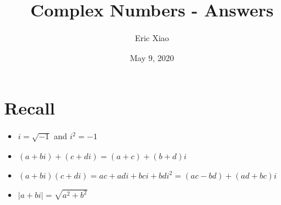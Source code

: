 \documentclass[12pt]{extarticle}
\title{Complex Numbers - Answers}
\author{Eric Xiao}
\date{May 9, 2020}
\begin{document}
\maketitle

\section{Recall}
\begin{itemize}
    \item {$i = \sqrt{-1}$ and $i^2 = -1$}
    \item {$(a+bi) + (c+di) = (a+c) + (b+d)i$}
    \item {$(a+bi)(c+di) = ac + adi + bci + bdi^2 = (ac-bd) + (ad+bc)i$}
    \item {$|a+bi| = \sqrt{a^2+b^2}$}
\end{itemize}
\end{document}
